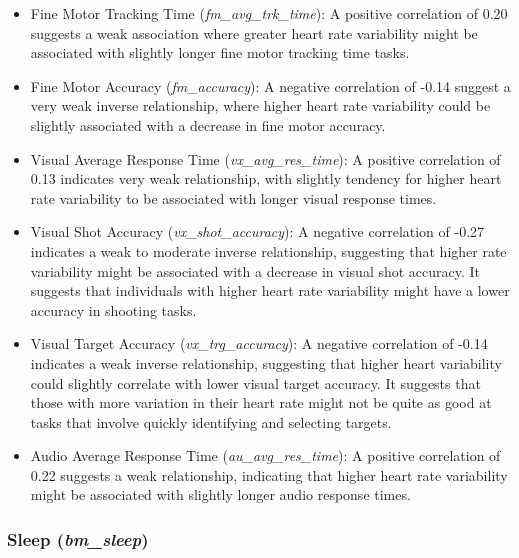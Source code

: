 \begin{itemize}
    \item Fine Motor Tracking Time (\textit{fm\_avg\_trk\_time}): A positive correlation of 0.20 suggests a weak association where greater heart rate variability 
    might be associated with slightly longer fine motor tracking time tasks.
    
    \item Fine Motor Accuracy (\textit{fm\_accuracy}): A negative correlation of -0.14 suggest a very weak inverse relationship, where higher heart rate variability
    could be slightly associated with a decrease in fine motor accuracy.
    
    \item Visual Average Response Time (\textit{vx\_avg\_res\_time}): A positive correlation of 0.13 indicates very weak relationship, with slightly tendency for
    higher heart rate variability to be associated with longer visual response times. 
    
    \item Visual Shot Accuracy (\textit{vx\_shot\_accuracy}): A negative correlation of -0.27 indicates a weak to moderate inverse relationship, suggesting that
    higher rate variability might be associated with a decrease in visual shot accuracy. It suggests that individuals with higher heart rate variability might 
    have a lower accuracy in shooting tasks.
    
    \item Visual Target Accuracy (\textit{vx\_trg\_accuracy}): A negative correlation of -0.14 indicates a weak inverse relationship, suggesting that higher heart 
    variability could slightly correlate with lower visual target accuracy. It suggests that those with more variation in their heart rate might not be quite as good 
    at tasks that involve quickly identifying and selecting targets.
    
    \item Audio Average Response Time (\textit{au\_avg\_res\_time}): A positive correlation of 0.22 suggests a weak relationship, indicating that higher heart rate
    variability might be associated with slightly longer audio response times.
    
\end{itemize}


\subsubsection*{Sleep (\textit{bm\_sleep})}

